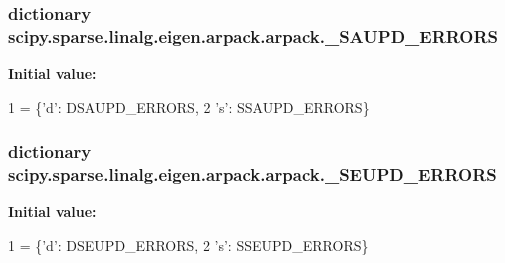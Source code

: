 \subsubsection[{\+\_\+\+S\+A\+U\+P\+D\+\_\+\+E\+R\+R\+O\+R\+S}]{\setlength{\rightskip}{0pt plus 5cm}dictionary scipy.\+sparse.\+linalg.\+eigen.\+arpack.\+arpack.\+\_\+\+S\+A\+U\+P\+D\+\_\+\+E\+R\+R\+O\+R\+S}\label{namespacescipy_1_1sparse_1_1linalg_1_1eigen_1_1arpack_1_1arpack_a8753784e721713413772ed405d67a3d6}
{\bfseries Initial value\+:}
\begin{DoxyCode}
1 = \{\textcolor{stringliteral}{'d'}: DSAUPD\_ERRORS,
2                  \textcolor{stringliteral}{'s'}: SSAUPD\_ERRORS\}
\end{DoxyCode}
\hypertarget{namespacescipy_1_1sparse_1_1linalg_1_1eigen_1_1arpack_1_1arpack_a332dcb29b5713ac6b13271bea8570994}{}
\subsubsection[{\+\_\+\+S\+E\+U\+P\+D\+\_\+\+E\+R\+R\+O\+R\+S}]{\setlength{\rightskip}{0pt plus 5cm}dictionary scipy.\+sparse.\+linalg.\+eigen.\+arpack.\+arpack.\+\_\+\+S\+E\+U\+P\+D\+\_\+\+E\+R\+R\+O\+R\+S}\label{namespacescipy_1_1sparse_1_1linalg_1_1eigen_1_1arpack_1_1arpack_a332dcb29b5713ac6b13271bea8570994}
{\bfseries Initial value\+:}
\begin{DoxyCode}
1 = \{\textcolor{stringliteral}{'d'}: DSEUPD\_ERRORS,
2                  \textcolor{stringliteral}{'s'}: SSEUPD\_ERRORS\}
\end{DoxyCode}
\hypertarget{namespacescipy_1_1sparse_1_1linalg_1_1eigen_1_1arpack_1_1arpack_ad9de489dedaf53d4c6b49d3cc4f58c8c}{}

